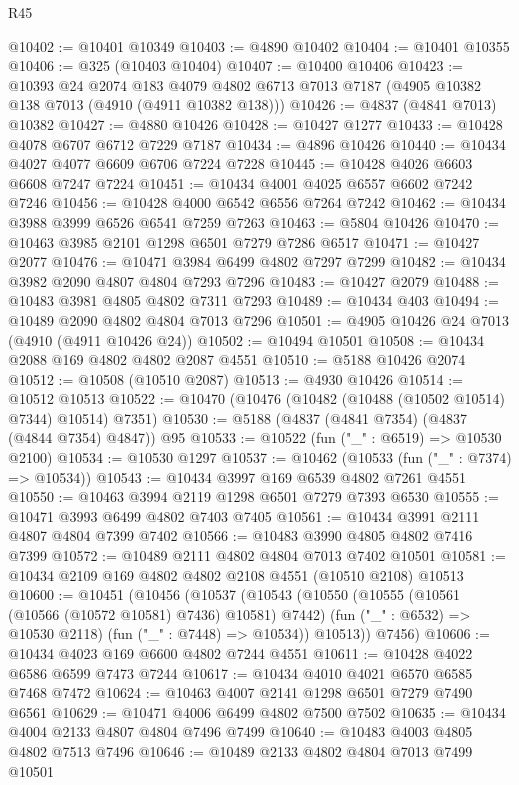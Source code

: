 \begin{lexlean}{R45}
\begin{coremodule}
@10402 := @10401 @10349
@10403 := @4890 @10402
@10404 := @10401 @10355
@10406 := @325 (@10403 @10404)
@10407 := @10400 @10406
@10423 := @10393
    @24
    @2074
    @183
    @4079
    @4802
    @6713
    @7013
    @7187
    (@4905 @10382 @138 @7013 (@4910 (@4911 @10382 @138)))
@10426 := @4837 (@4841 @7013) @10382
@10427 := @4880 @10426
@10428 := @10427 @1277
@10433 := @10428 @4078 @6707 @6712 @7229 @7187
@10434 := @4896 @10426
@10440 := @10434 @4027 @4077 @6609 @6706 @7224 @7228
@10445 := @10428 @4026 @6603 @6608 @7247 @7224
@10451 := @10434 @4001 @4025 @6557 @6602 @7242 @7246
@10456 := @10428 @4000 @6542 @6556 @7264 @7242
@10462 := @10434 @3988 @3999 @6526 @6541 @7259 @7263
@10463 := @5804 @10426
@10470 := @10463 @3985 @2101 @1298 @6501 @7279 @7286 @6517
@10471 := @10427 @2077
@10476 := @10471 @3984 @6499 @4802 @7297 @7299
@10482 := @10434 @3982 @2090 @4807 @4804 @7293 @7296
@10483 := @10427 @2079
@10488 := @10483 @3981 @4805 @4802 @7311 @7293
@10489 := @10434 @403
@10494 := @10489 @2090 @4802 @4804 @7013 @7296
@10501 := @4905 @10426 @24 @7013 (@4910 (@4911 @10426 @24))
@10502 := @10494 @10501
@10508 := @10434 @2088 @169 @4802 @4802 @2087 @4551
@10510 := @5188 @10426 @2074
@10512 := @10508 (@10510 @2087)
@10513 := @4930 @10426
@10514 := @10512 @10513
@10522 := @10470 (@10476 (@10482 (@10488 (@10502 @10514) @7344) @10514) @7351)
@10530 := @5188 (@4837 (@4841 @7354) (@4837 (@4844 @7354) @4847)) @95
@10533 := @10522 (fun ("_" : @6519) => @10530 @2100)
@10534 := @10530 @1297
@10537 := @10462 (@10533 (fun ("_" : @7374) => @10534))
@10543 := @10434 @3997 @169 @6539 @4802 @7261 @4551
@10550 := @10463 @3994 @2119 @1298 @6501 @7279 @7393 @6530
@10555 := @10471 @3993 @6499 @4802 @7403 @7405
@10561 := @10434 @3991 @2111 @4807 @4804 @7399 @7402
@10566 := @10483 @3990 @4805 @4802 @7416 @7399
@10572 := @10489 @2111 @4802 @4804 @7013 @7402 @10501
@10581 := @10434 @2109 @169 @4802 @4802 @2108 @4551 (@10510 @2108) @10513
@10600 := @10451
    (@10456
      (@10537
        (@10543
          (@10550
            (@10555 (@10561 (@10566 (@10572 @10581) @7436) @10581) @7442)
            (fun ("_" : @6532) => @10530 @2118)
            (fun ("_" : @7448) => @10534))
          @10513))
      @7456)
@10606 := @10434 @4023 @169 @6600 @4802 @7244 @4551
@10611 := @10428 @4022 @6586 @6599 @7473 @7244
@10617 := @10434 @4010 @4021 @6570 @6585 @7468 @7472
@10624 := @10463 @4007 @2141 @1298 @6501 @7279 @7490 @6561
@10629 := @10471 @4006 @6499 @4802 @7500 @7502
@10635 := @10434 @4004 @2133 @4807 @4804 @7496 @7499
@10640 := @10483 @4003 @4805 @4802 @7513 @7496
@10646 := @10489 @2133 @4802 @4804 @7013 @7499 @10501

\end{coremodule}
\end{lexlean}
